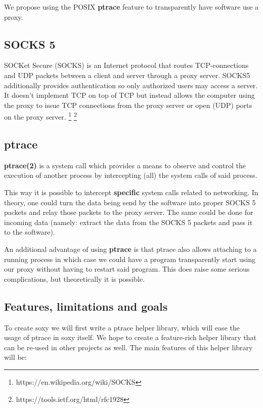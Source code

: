 \documentclass[a4paper]{article}
\begin{document}
We propose using the POSIX \textbf{ptrace} feature to transparently have
software use a proxy.

\subsection{SOCKS 5}

SOCKet Secure (SOCKS) is an Internet protocol that routes TCP-connections and
UDP packets between a client and server through a proxy server. SOCKS5
additionally provides authentication so only authorized users may access a
server. It doesn't implement TCP on top of TCP but instead allows the computer using
the proxy to issue TCP connections from the proxy server or open (UDP) ports on the
proxy server.
\footnote{https://en.wikipedia.org/wiki/SOCKS}
\footnote{https://tools.ietf.org/html/rfc1928}

\subsection{ptrace}

\textbf{ptrace(2)} is a system call which provides a means to observe and
control the execution of another process by intercepting (all) the system calls
of said process.

This way it is possible to intercept \textbf{specific} system calls related to
networking. In theory, one could turn the data being send by the software into
proper SOCKS 5 packets and relay those packets to the proxy server. The same
could be done for incoming data (namely: extract the data from the SOCKS 5
packets and pass it to the software).

An additional advantage of using \textbf{ptrace} is that ptrace also allows
attaching to a running process in which case we could have a program
transparently start using our proxy without having to restart said program. This
does raise some serious complications, but theoretically it is possible.

\subsection{Features, limitations and goals}

To create soxy we will first write a ptrace helper library, which will ease the
usage of ptrace in soxy itself. We hope to create a feature-rich helper library
that can be re-used in other projects as well. The main features of this helper
library will be:
\end{document}
